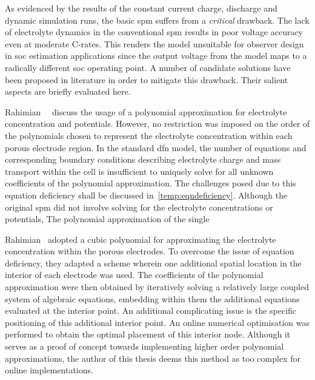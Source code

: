 
As  evidenced by  the  results of  the constant  current  charge, discharge  and
dynamic  simulation runs,  the basic  \gls{spm} suffers  from a  \emph{critical}
drawback. The lack of electrolyte dynamics in the conventional \gls{spm} results
in  poor voltage  accuracy  even at  moderate C-rates.  This  renders the  model
unsuitable for  observer design in  \gls{soc} estimation applications  since the
output voltage from the model maps  to a radically different \gls{soc} operating
point. A number of candidate solutions have been proposed in literature in order
to mitigate this drawback. Their salient aspects are briefly evaluated here.

Rahimian~\etal{}~\cite{KhaleghiRahimian2013} discuss  the usage of  a polynomial
approximation  for   electrolyte  concentration  and  potentials.   However,  no
restriction was imposed on the order  of the polynomials chosen to represent the
electrolyte concentration within  each porous electrode region.  In the standard
\gls{dfn} model, the  number of equations and  corresponding boundary conditions
describing electrolyte charge and mass transport within the cell is insufficient
to uniquely solve for all  unknown coefficients of the polynomial approximation.
The  challenges  posed  due  to  this equation  deficiency  shall  be  discussed
in~\cref{temp:eqndeficiency}. Although  the original  \gls{spm} did  not involve
solving  for  the  electrolyte  concentrations  or  potentials,  The  polynomial
approximation of the single


Rahimian~\etal{} adopted  a cubic  polynomial for approximating  the electrolyte
concentration within  the porous electrodes.  To overcome the issue  of equation
deficiency, they adapted a scheme wherein one additional spatial location in the
interior  of  each  electrode  was  used. The  coefficients  of  the  polynomial
approximation  were then  obtained  by iteratively  solving  a relatively  large
coupled  system of  algebraic equations,  embedding within  them the  additional
equations evaluated at  the interior point. An additional  complicating issue is
the specific positioning of this  additional interior point. An online numerical
optimisation  was performed  to obtain  the optimal  placement of  this interior
node. Although it serves as a proof of concept towards implementing higher order
polynomial approximations,  the author of this  thesis deems this method  as too
complex for online implementations.


